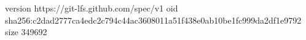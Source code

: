 version https://git-lfs.github.com/spec/v1
oid sha256:c2dad2777ca4edc2c794c44ac3608011a51f438e0ab10be1fc999da2df1e9792
size 349692
